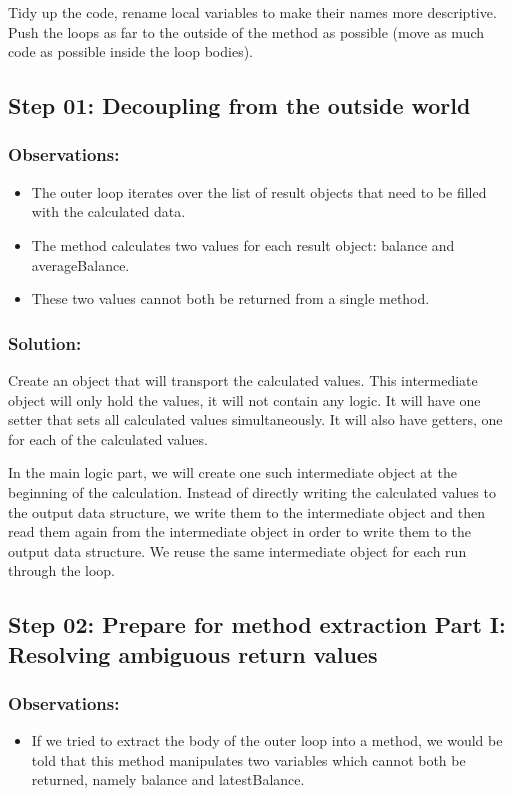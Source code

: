 \documentclass[a4paper,fleqn,titlepage,11pt]{article}
\begin{document}
Tidy up the code, rename local variables to make their names more descriptive.
Push the loops as far to the outside of the method as possible (move as much code as possible inside the loop bodies).

\subsection*{Step 01: Decoupling from the outside world}

\subsubsection*{Observations:}
\begin{itemize}
\item The outer loop iterates over the list of result objects that need to be filled with the calculated data.
\item The method calculates two values for each result object: balance and averageBalance. 
\item These two values cannot both be returned from a single method.
\end{itemize}

\subsubsection*{Solution:}

Create an object that will transport the calculated values. 
This intermediate object will only hold the values, it will not contain any logic. It will have one setter that sets all calculated values simultaneously. It will also have getters, one for each of the calculated values.

In the main logic part, we will create one such intermediate object at the beginning of the calculation. Instead of directly writing the calculated values to the output data structure, we write them to the intermediate object and then read them again from the intermediate object in order to write them to the output data structure. We reuse the same intermediate object for each run through the loop.


\subsection*{Step 02: Prepare for method extraction Part I: Resolving ambiguous return values}

\subsubsection*{Observations:}
\begin{itemize}
\item If we tried to extract the body of the outer loop into a method, we would be told that this method manipulates two variables which cannot both be returned, namely balance and latestBalance.
\end{itemize}
\end{document}
